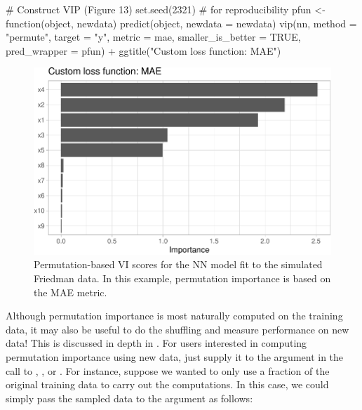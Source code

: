 \begin{Schunk}
\begin{Sinput}
# Construct VIP (Figure 13)
set.seed(2321)  # for reproducibility
pfun <- function(object, newdata)  predict(object, newdata = newdata)
vip(nn, method = "permute", target = "y", metric = mae,
    smaller_is_better = TRUE, pred_wrapper = pfun) +
  ggtitle("Custom loss function: MAE")
\end{Sinput}
\begin{figure}[!htb]

{\centering \includegraphics[width=0.7\linewidth]{greenwell-boehmke_files/figure-latex/vip-nn-mae-1} 

}

\caption[Permutation-based VI scores for the NN model fit to the simulated Friedman data]{Permutation-based VI scores for the NN model fit to the simulated Friedman data. In this example, permutation importance is based on the MAE metric.}\label{fig:vip-nn-mae}
\end{figure}
\end{Schunk}

Although permutation importance is most naturally computed on the
training data, it may also be useful to do the shuffling and measure
performance on new data! This is discussed in depth in
\citet[sec. 5.2]{molnar-2019-iml}. For users interested in computing
permutation importance using new data, just supply it to the
 argument in the call to , , or
. For instance, suppose we wanted to only use a
fraction of the original training data to carry out the computations. In
this case, we could simply pass the sampled data to the 
argument as follows:

